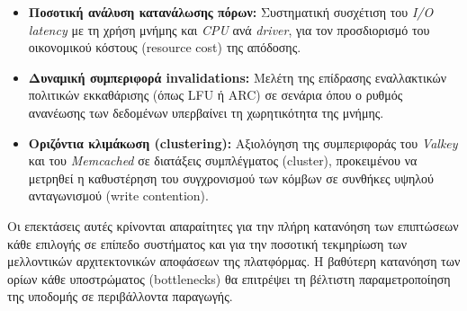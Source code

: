 \begin{itemize}
	\item \textbf{Ποσοτική ανάλυση κατανάλωσης πόρων:} Συστηματική
	      συσχέτιση του \textit{I/O latency} με τη χρήση μνήμης και
	      \textit{CPU} ανά \textit{driver}, για τον προσδιορισμό του
	      οικονομικού κόστους (resource cost) της απόδοσης.
	\item \textbf{Δυναμική συμπεριφορά invalidations:} Μελέτη της επίδρασης
	      εναλλακτικών πολιτικών εκκαθάρισης (όπως LFU ή ARC) σε σενάρια
	      όπου ο ρυθμός ανανέωσης των δεδομένων υπερβαίνει τη
	      χωρητικότητα της μνήμης.
	\item \textbf{Οριζόντια κλιμάκωση (clustering):} Αξιολόγηση της
	      συμπεριφοράς του \textit{Valkey} και του \textit{Memcached} σε
	      διατάξεις συμπλέγματος (cluster), προκειμένου να μετρηθεί η
	      καθυστέρηση του συγχρονισμού των κόμβων σε συνθήκες υψηλού
	      ανταγωνισμού (write contention).
\end{itemize}

Οι επεκτάσεις αυτές κρίνονται απαραίτητες για την πλήρη κατανόηση των
επιπτώσεων κάθε επιλογής σε επίπεδο συστήματος και για την ποσοτική τεκμηρίωση
των μελλοντικών αρχιτεκτονικών αποφάσεων της πλατφόρμας. Η βαθύτερη κατανόηση
των ορίων κάθε υποστρώματος (bottlenecks) θα επιτρέψει τη βέλτιστη
παραμετροποίηση της υποδομής σε περιβάλλοντα παραγωγής.
